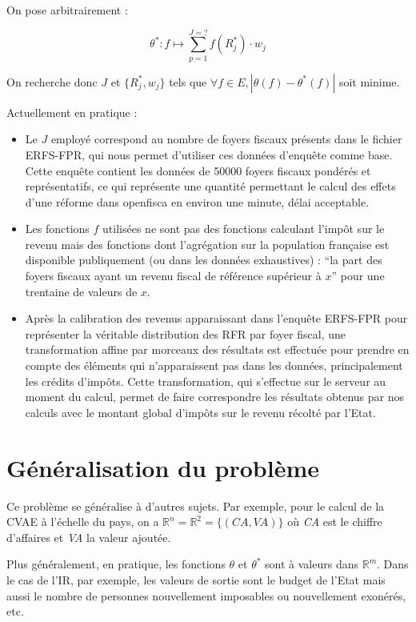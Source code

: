 \documentclass[12pt]{article}
\begin{document}
On pose arbitrairement :

\begin{displaymath}
  \theta^*: f \longmapsto \sum_{p=1}^{J=?} f(R^*_j) \cdot w_j
\end{displaymath}

On recherche donc $J$ et $\{ R^*_j, w_j \}$ tels que $\forall f \in E, |\theta(f) - \theta^*(f)|$ soit minime.
\newline

Actuellement en pratique :
\begin{itemize}
  \item Le $J$ employé correspond au nombre de foyers fiscaux présents dans le fichier ERFS-FPR,
  qui nous permet d'utiliser ces données d'enquête comme base. Cette enquête contient les
  données de 50000 foyers fiscaux pondérés et représentatifs, ce qui représente une quantité
  permettant le calcul des effets d'une réforme dans openfisca en environ une minute,
  délai acceptable.
  \item Les fonctions $f$ utilisées ne sont pas des fonctions calculant l'impôt sur le revenu
  mais des fonctions dont l'agrégation sur la population française est disponible publiquement
  (ou dans les données exhaustives) : ``la part des foyers fiscaux ayant un revenu fiscal de
  référence supérieur à $x$'' pour une trentaine de valeurs de $x$.
  \item Après la calibration des revenus apparaissant dans l'enquête ERFS-FPR pour représenter
  la véritable distribution des RFR par foyer fiscal, une transformation affine par morceaux
  des résultats est effectuée pour prendre en compte des éléments qui n'apparaissent pas dans
  les données, principalement les crédits d'impôts. Cette transformation, qui s'effectue sur
  le serveur au moment du calcul, permet de faire correspondre les résultats obtenus par nos
  calculs avec le montant global d'impôts sur le revenu récolté par l'Etat.
\end{itemize}

\section{Généralisation du problème}
\label{generalisation}

Ce problème se généralise à d'autres sujets. Par exemple, pour le calcul de la CVAE
à l'échelle du pays, on a $\mathbb{R}^n=\mathbb{R}^2=\{ (CA, VA) \}$ où \emph{CA} est le chiffre d'affaires
et \emph{VA} la valeur ajoutée.

Plus généralement, en pratique, les fonctions $\theta$ et $\theta^*$ sont à valeurs dans $\mathbb{R}^m$.
Dans le cas de l'IR, par exemple, les valeurs de sortie sont le budget de l'Etat mais aussi
le nombre de personnes nouvellement imposables ou nouvellement exonérés, etc.
\end{document}
